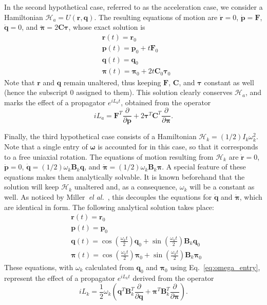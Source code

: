 \documentclass[aip,jcp,reprint,amsmath,amssymb]{revtex4-1}
\newcommand{\mt}[1]{\boldsymbol{\mathbf{#1}}}           %
\newcommand{\vt}[1]{\boldsymbol{\mathbf{#1}}}           %
\newcommand{\tr}[1]{#1^T}                               %
\newcommand{\diff}[2]{\dfrac{\partial #1}{\partial #2}} %
\begin{document}
In the second hypothetical case, referred to as the acceleration case, we consider a Hamiltonian $\mathcal{H}_a = U(\vt r, \vt q)$. The resulting equations of motion are $\dot{\vt r} = 0$, $\dot{\vt p} = \vt F$, $\dot{\vt q} = 0$, and $\dot{\vt \pi} = 2 \mt C \vt \tau$, whose exact solution is
\begin{align*}
&{\vt r}(t) = {\vt r}_0 \\
&{\vt p}(t) = {\vt p}_0 + t \vt F_0 \\
&{\vt q}(t) = {\vt q}_0 \\
&{\vt \pi}(t) = {\vt \pi}_0 +  2 t \mt C_0 \vt \tau_0
\end{align*}
Note that $\vt r$ and $\vt q$ remain unaltered, thus keeping $\vt F$, $\mt C$, and $\vt \tau$ constant as well (hence the subscript $0$ assigned to them). This solution clearly conserves $\mathcal{H}_a$, and marks the effect of a propagator $e^{i L_a t}$, obtained from the operator
\[
i L_a = \tr{\vt F} \diff{}{\vt p} + 2 \tr{\vt \tau} \tr{\mt C} \diff{}{\vt \pi}.
\]

Finally, the third hypothetical case consists of a Hamiltonian $\mathcal{H}_k = (1/2) I_k \omega_k^2$. Note that a single entry of $\vt \omega$ is accounted for in this case, so that it corresponds to a free uniaxial rotation. The equations of motion resulting from $\mathcal{H}_k$ are $\dot{\vt r} = 0$, $\dot{\vt p} = 0$, $\dot{\vt q} = (1/2) \omega_k {\mt B}_k \vt q$, and $\dot{\vt \pi} = (1/2) \omega_k {\mt B}_k \vt \pi$. A special feature of these equations makes them analytically solvable. It is known beforehand that the solution will keep $\mathcal{H}_k$ unaltered and, as a consequence, $\omega_k$ will be a constant as well. As noticed by Miller~\textit{el al.}~\cite{Miller2002}, this decouples the equations for $\dot{\vt q}$ and $\dot{\vt \pi}$, which are identical in form. The following analytical solution takes place:\cite{Miller2002}
\begin{align}
&{\vt r}(t) = {\vt r}_0 \\
&{\vt p}(t) = {\vt p}_0 \\
&{\vt q}(t) = \cos\left(\frac{\omega_k t}{2}\right) \vt q_0 + \sin\left(\frac{\omega_k t}{2}\right) \mt B_k \vt q_0 \\
&{\vt \pi}(t) = \cos\left(\frac{\omega_k t}{2}\right) \vt \pi_0 + \sin\left(\frac{\omega_k t}{2}\right) \mt B_k \vt \pi_0
\end{align}
These equations, with $\omega_k$ calculated from $\vt q_0$ and $\vt \pi_0$ using Eq.~\ref{eq:omega_entry}, represent the effect of a propagator $e^{i L_k t}$ derived from the operator
\[
i L_k = \frac{1}{2} \omega_k \left( \tr{\vt q}\tr{{\mt B}_k} \diff{}{\vt q} + \tr{\vt \pi}\tr{{\mt B}_k} \diff{}{\vt \pi} \right).
\]
\end{document}
